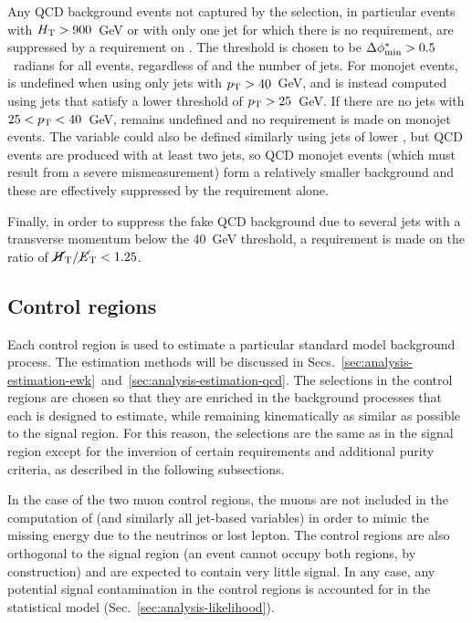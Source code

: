 Any QCD background events not captured by the \alphat selection, in particular 
events with $\mbox{$H_\text{T}$}>900$~GeV or with only one jet for which there is no 
\alphat requirement, are suppressed by a requirement on \bdphi. The threshold 
is chosen to be $\mbox{$\Delta\phi^{*}_{\mathrm{min}}$}>0.5$~radians for all events, regardless of \scalht and 
the 
number of jets. For monojet events, \bdphi is undefined when using only jets 
with ${p_{\text T}}>40$~GeV, and is instead computed using jets that satisfy a lower 
threshold of ${p_{\text T}}>25$~GeV. If there are no jets with $25<{p_{\text T}}<40$~GeV, \bdphi 
remains undefined and no requirement is made on monojet events. The \alphat 
variable could also be defined similarly using jets of lower \pt, but QCD 
events are produced with at least two jets, so QCD monojet events (which must 
result from a severe mismeasurement) form a relatively smaller background and 
these are effectively suppressed by the \bdphi requirement alone.

Finally, in order to suppress the fake \met QCD background due to several jets 
with a transverse momentum below the 40~GeV threshold, a requirement is made on 
the \mhtmet ratio of $\mbox{$\mbox{$\cancel{H}_\text{T}$} / \mbox{$\cancel{E}_\text{T}$}$} < 1.25$.

\subsection{Control regions}

Each control region is used to estimate a particular standard model background 
process. The estimation methods will be discussed in 
Secs.~\ref{sec:analysis-estimation-ewk}~and~\ref{sec:analysis-estimation-qcd}.
The selections in the control regions are chosen so that they are enriched in 
the background processes that each is designed to estimate, while remaining 
kinematically as similar as possible to the signal region. 
For this reason, the 
selections are the same as in the signal region except for the inversion of 
certain requirements and additional purity criteria, as described in the 
following subsections.

In the case of the two muon control regions, the muons are not included in the 
computation of \met (and similarly all jet-based variables) in order to mimic 
the missing energy due to the neutrinos or lost lepton.
The control regions are also orthogonal to the signal 
region (an event cannot occupy both regions, by construction) and are expected 
to contain very little signal. In any case, any potential signal contamination 
in the control regions is accounted for in the statistical model 
(Sec.~\ref{sec:analysis-likelihood}).

